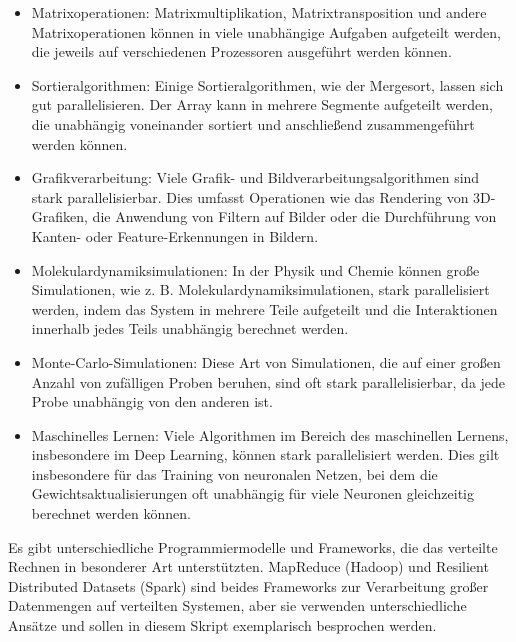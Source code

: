 \begin{itemize}
\item Matrixoperationen: Matrixmultiplikation, Matrixtransposition und andere Matrixoperationen können in viele unabhängige Aufgaben aufgeteilt werden, die jeweils auf verschiedenen Prozessoren ausgeführt werden können.
\item Sortieralgorithmen: Einige Sortieralgorithmen, wie der Mergesort, lassen sich gut parallelisieren. Der Array kann in mehrere Segmente aufgeteilt werden, die unabhängig voneinander sortiert und anschließend zusammengeführt werden können.
\item Grafikverarbeitung: Viele Grafik- und Bildverarbeitungsalgorithmen sind stark parallelisierbar. Dies umfasst Operationen wie das Rendering von 3D-Grafiken, die Anwendung von Filtern auf Bilder oder die Durchführung von Kanten- oder Feature-Erkennungen in Bildern.
\item Molekulardynamiksimulationen: In der Physik und Chemie können große Simulationen, wie z. B. Molekulardynamiksimulationen, stark parallelisiert werden, indem das System in mehrere Teile aufgeteilt und die Interaktionen innerhalb jedes Teils unabhängig berechnet werden.
\item Monte-Carlo-Simulationen: Diese Art von Simulationen, die auf einer großen Anzahl von zufälligen Proben beruhen, sind oft stark parallelisierbar, da jede Probe unabhängig von den anderen ist.
\item Maschinelles Lernen: Viele Algorithmen im Bereich des maschinellen Lernens, insbesondere im Deep Learning, können stark parallelisiert werden. Dies gilt insbesondere für das Training von neuronalen Netzen, bei dem die Gewichtsaktualisierungen oft unabhängig für viele Neuronen gleichzeitig berechnet werden können.
\end{itemize}

Es gibt unterschiedliche Programmiermodelle und Frameworks, die das verteilte Rechnen in besonderer Art unterstützten. 
MapReduce (Hadoop) und Resilient Distributed Datasets (Spark) sind beides Frameworks zur Verarbeitung großer Datenmengen auf verteilten Systemen, aber sie verwenden unterschiedliche Ansätze und sollen in diesem Skript exemplarisch besprochen werden.

